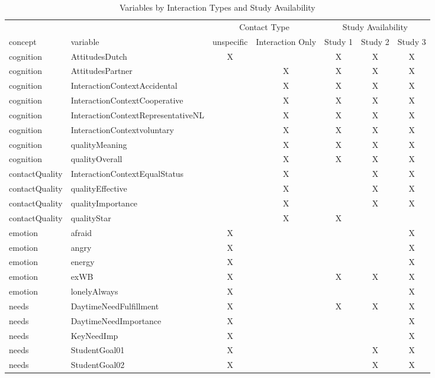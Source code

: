 \documentclass[
]{article}
\begin{document}
\begin{table}

\caption{\label{tab:variable names by response type and study}Variables by Interaction Types and Study Availability}
\centering
\begin{tabular}[t]{llccccc}
\toprule
\multicolumn{2}{c}{ } & \multicolumn{2}{c}{Contact Type} & \multicolumn{3}{c}{Study Availability} \\
\cmidrule(l{3pt}r{3pt}){3-4} \cmidrule(l{3pt}r{3pt}){5-7}
concept & variable & unspecific & Interaction Only & Study 1 & Study 2 & Study 3\\
\midrule
cognition & AttitudesDutch & X &  & X & X & X\\
cognition & AttitudesPartner &  & X & X & X & X\\
cognition & InteractionContextAccidental &  & X & X & X & X\\
cognition & InteractionContextCooperative &  & X & X & X & X\\
cognition & InteractionContextRepresentativeNL &  & X & X & X & X\\
\addlinespace
cognition & InteractionContextvoluntary &  & X & X & X & X\\
cognition & qualityMeaning &  & X & X & X & X\\
cognition & qualityOverall &  & X & X & X & X\\
contactQuality & InteractionContextEqualStatus &  & X &  & X & X\\
contactQuality & qualityEffective &  & X &  & X & X\\
\addlinespace
contactQuality & qualityImportance &  & X &  & X & X\\
contactQuality & qualityStar &  & X & X &  & \\
emotion & afraid & X &  &  &  & X\\
emotion & angry & X &  &  &  & X\\
emotion & energy & X &  &  &  & X\\
\addlinespace
emotion & exWB & X &  & X & X & X\\
emotion & lonelyAlways & X &  &  &  & X\\
needs & DaytimeNeedFulfillment & X &  & X & X & X\\
needs & DaytimeNeedImportance & X &  &  &  & X\\
needs & KeyNeedImp & X &  &  &  & X\\
\addlinespace
needs & StudentGoal01 & X &  &  & X & X\\
needs & StudentGoal02 & X &  &  & X & X\\

\end{tabular}
\end{table}
\end{document}
